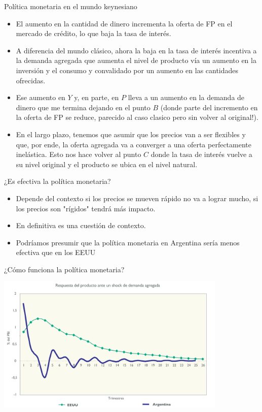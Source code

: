 \documentclass{beamer}
\begin{document}
\begin{frame}{Política monetaria en el mundo keynesiano}

\begin{itemize}
    \item El aumento en la cantidad de dinero incrementa la oferta de FP en el mercado de crédito, lo que baja la tasa de interés. 
    \item A diferencia del mundo clásico, ahora la baja en la tasa de interés incentiva a la demanda agregada que aumenta el nivel de producto vía un aumento en la inversión y el consumo y convalidado por un aumento en las cantidades ofrecidas. 
    \item Ese aumento en $Y$ y, en parte, en $P$ lleva a un aumento en la demanda de dinero que me termina dejando en el punto $B$ (donde parte del incremento en la oferta de FP se reduce, parecido al caso clasico pero sin volver al original!).
    \item En el largo plazo, tenemos que asumir que los precios van a ser flexibles y que, por ende, la oferta agregada va a converger a una oferta perfectamente inelástica. Esto nos hace volver al punto $C$ donde la tasa de interés vuelve a su nivel original y el producto se ubica en el nivel natural.
\end{itemize}
 

\end{frame}

\begin{frame}{¿Es efectiva la política monetaria?}

    \begin{itemize}
        \item Depende del contexto si los precios se mueven rápido no va a lograr mucho, si los precios son "rígidos" tendrá más impacto. 
        \item En definitiva es una cuestión de contexto.
        \item Podríamos presumir que la política monetaria en Argentina sería menos efectiva que en los EEUU

    \end{itemize}
    
\end{frame}

\begin{frame}{¿Cómo funciona la política monetaria?}
    
    \centering\includegraphics[width=11cm]{Slides Principios de Economia/P81.png}\

\end{frame}
\end{document}
